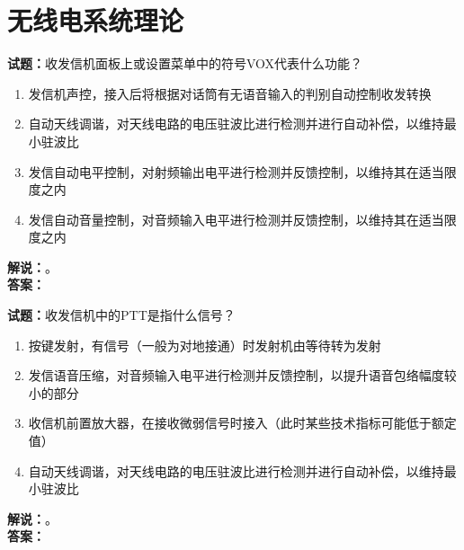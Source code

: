 \documentclass{ctexbook}
\begin{document}
\bigskip






























\chapter{无线电系统理论}

\newpage

\noindent\textbf{试题：}收发信机面板上或设置菜单中的符号VOX代表什么功能？
\begin{enumerate}[leftmargin=3em]
\item 发信机声控，接入后将根据对话筒有无语音输入的判别自动控制收发转换
\item 自动天线调谐，对天线电路的电压驻波比进行检测并进行自动补偿，以维持最小驻波比
\item 发信自动电平控制，对射频输出电平进行检测并反馈控制，以维持其在适当限度之内
\item 发信自动音量控制，对音频输入电平进行检测并反馈控制，以维持其在适当限度之内
\end{enumerate}
\noindent\textbf{解说：}\textbf{}。\\\noindent\textbf{答案：}

\bigskip




\noindent\textbf{试题：}收发信机中的PTT是指什么信号？
\begin{enumerate}[leftmargin=3em]
\item 按键发射，有信号（一般为对地接通）时发射机由等待转为发射
\item 发信语音压缩，对音频输入电平进行检测并反馈控制，以提升语音包络幅度较小的部分
\item 收信机前置放大器，在接收微弱信号时接入（此时某些技术指标可能低于额定值）
\item 自动天线调谐，对天线电路的电压驻波比进行检测并进行自动补偿，以维持最小驻波比
\end{enumerate}
\noindent\textbf{解说：}\textbf{}。\\\noindent\textbf{答案：}
\end{document}
